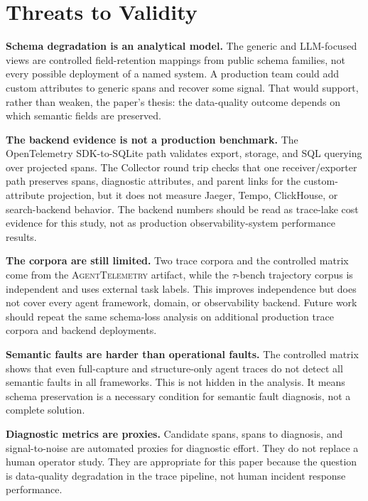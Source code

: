 \documentclass[conference]{IEEEtran}
\begin{document}
\section{Threats to Validity}
\label{sec:threats}

\textbf{Schema degradation is an analytical model.} The generic and
LLM-focused views are controlled field-retention mappings from public
schema families, not every possible deployment of a named system. A
production team could add custom attributes to generic spans and recover
some signal. That would support, rather than weaken, the paper's thesis:
the data-quality outcome depends on which semantic fields are preserved.

\textbf{The backend evidence is not a production benchmark.} The
OpenTelemetry SDK-to-SQLite path validates export, storage, and SQL
querying over projected spans. The Collector round trip checks that one
receiver/exporter path preserves spans, diagnostic attributes, and
parent links for the custom-attribute projection, but it does not
measure Jaeger, Tempo, ClickHouse, or search-backend behavior. The
backend numbers should be read as trace-lake cost evidence for this
study, not as production observability-system performance results.

\textbf{The corpora are still limited.} Two trace corpora and the
controlled matrix come from the \textsc{AgentTelemetry} artifact, while
the $\tau$-bench trajectory corpus is independent and uses external task
labels. This improves independence but does not cover every agent
framework, domain, or observability backend. Future work should repeat
the same schema-loss analysis on additional production trace corpora
and backend deployments.

\textbf{Semantic faults are harder than operational faults.} The
controlled matrix shows that even full-capture and structure-only agent
traces do not detect all semantic faults in all frameworks. This is not
hidden in the analysis. It means schema preservation is a necessary
condition for semantic fault diagnosis, not a complete solution.

\textbf{Diagnostic metrics are proxies.} Candidate spans, spans to
diagnosis, and signal-to-noise are automated proxies for diagnostic
effort. They do not replace a human operator study. They are appropriate
for this paper because the question is data-quality degradation in the
trace pipeline, not human incident response performance.
\end{document}
